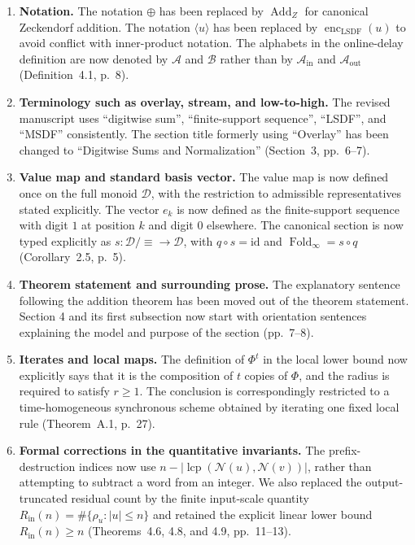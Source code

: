 \documentclass[11pt]{article}
\begin{document}
\begin{enumerate}[leftmargin=*]
\item \textbf{Notation.}
The notation $\oplus$ has been replaced by $\operatorname{Add}_{Z}$ for
canonical Zeckendorf addition.  The notation $\langle u\rangle$ has been
replaced by $\operatorname{enc}_{\mathrm{LSDF}}(u)$ to avoid conflict with
inner-product notation.  The alphabets in the online-delay definition are now
denoted by $\mathcal A$ and $\mathcal B$ rather than by
$\mathcal A_{\mathrm{in}}$ and $\mathcal A_{\mathrm{out}}$
(Definition~4.1, p.~8).

\item \textbf{Terminology such as overlay, stream, and low-to-high.}
The revised manuscript uses ``digitwise sum'', ``finite-support sequence'',
``LSDF'', and ``MSDF'' consistently.  The section title formerly using
``Overlay'' has been changed to ``Digitwise Sums and Normalization''
(Section~3, pp.~6--7).

\item \textbf{Value map and standard basis vector.}
The value map is now defined once on the full monoid $\mathcal D$, with the
restriction to admissible representatives stated explicitly.  The vector
$e_k$ is now defined as the finite-support sequence with digit $1$ at position
$k$ and digit $0$ elsewhere.  The canonical section is now typed explicitly
as $s:\mathcal D/\!\equiv\to\mathcal D$, with $q\circ s=\mathrm{id}$ and
$\operatorname{Fold}_\infty=s\circ q$ (Corollary~2.5, p.~5).

\item \textbf{Theorem statement and surrounding prose.}
The explanatory sentence following the addition theorem has been moved out of
the theorem statement.  Section 4 and its first subsection now start with
orientation sentences explaining the model and purpose of the section
(pp.~7--8).

\item \textbf{Iterates and local maps.}
The definition of $\Phi^t$ in the local lower bound now explicitly says that
it is the composition of $t$ copies of $\Phi$, and the radius is required to
satisfy $r\ge1$.  The conclusion is correspondingly restricted to a
time-homogeneous synchronous scheme obtained by iterating one fixed local rule
(Theorem~A.1, p.~27).

\item \textbf{Formal corrections in the quantitative invariants.}
The prefix-destruction indices now use
$n-|\operatorname{lcp}(\mathcal N(u),\mathcal N(v))|$, rather than attempting
to subtract a word from an integer.  We also replaced the output-truncated
residual count by the finite input-scale quantity
$R_{\mathrm{in}}(n)=\#\{\rho_u:|u|\le n\}$ and retained the explicit linear
lower bound $R_{\mathrm{in}}(n)\ge n$ (Theorems~4.6, 4.8, and 4.9,
pp.~11--13).


\end{enumerate}
\end{document}
